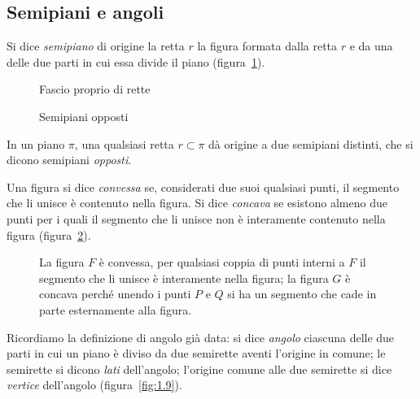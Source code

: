 \ovalbox{\risolvii \ref{ese:1.43}, \ref{ese:1.44}, \ref{ese:1.45}, \ref{ese:1.46}, \ref{ese:1.47}, \ref{ese:1.48}, \ref{ese:1.49}, \ref{ese:1.50}}

\subsection{Semipiani e angoli}

\begin{definizione}
Si dice \emph{semipiano} di origine la retta $r$ la figura formata dalla retta $r$ e da una delle due parti in cui essa divide il piano (figura~\ref{fig:1.17}).
\end{definizione}
\begin{figure}[b,t,h]
 \begin{minipage}[b]{.40\textwidth}
 \centering
 \caption{Fascio proprio di rette}\label{fig:1.16}
 \end{minipage}\hfil
 \begin{minipage}[b]{.40\textwidth}
 \centering
  \caption{Semipiani opposti}\label{fig:1.17}
  \end{minipage}
\end{figure}
In un piano ${\pi}$, una qualsiasi retta $r \subset \pi$ dà origine a due semipiani distinti, che si dicono semipiani \emph{opposti}.

\begin{definizione}
Una figura si dice \emph{convessa} se, considerati due suoi qualsiasi punti, il segmento che li unisce è contenuto nella figura. Si dice \emph{concava} se esistono almeno due punti per i quali il segmento che li unisce non è interamente contenuto nella figura (figura~\ref{fig:1.18}).
\end{definizione}
\begin{figure}[b,t,h]
 \centering 
 \caption{La figura $ F $ è convessa, per qualsiasi coppia di punti interni a $ F $ il segmento che li unisce è interamente nella figura; la figura $ G $ è concava perché unendo i punti $ P $ e $ Q $ si ha un segmento che cade in parte esternamente alla figura.}\label{fig:1.18}
\end{figure}

Ricordiamo la definizione di angolo già data: si dice \emph{angolo} ciascuna delle due parti in cui un piano è diviso da due semirette aventi l'origine in comune; le semirette si dicono \emph{lati} dell'angolo; l'origine comune alle due semirette si dice \emph{vertice} dell'angolo (figura~\ref{fig:1.9}).

